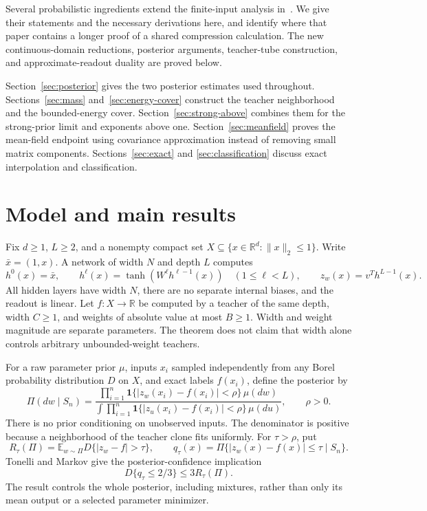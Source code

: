 \documentclass[11pt]{article}
\theoremstyle{remark}\newtheorem{remark}[theorem]{Remark}
\newcommand{\E}{\mathbb E}\newcommand{\Prb}{\mathbb P}\newcommand{\R}{\mathbb R}
\begin{document}
Several probabilistic ingredients extend the finite-input analysis
in~\cite{nongaus}. We give their statements and the necessary derivations
here, and identify where that paper contains a longer proof of a shared
compression calculation. The new continuous-domain reductions, posterior
arguments, teacher-tube construction, and approximate-readout duality are
proved below.

Section~\ref{sec:posterior} gives the two posterior estimates used
throughout. Sections~\ref{sec:mass} and~\ref{sec:energy-cover} construct
the teacher neighborhood and the bounded-energy cover.
Section~\ref{sec:strong-above} combines them for the strong-prior limit
and exponents above one. Section~\ref{sec:meanfield} proves the
mean-field endpoint using covariance approximation instead of removing
small matrix components. Sections~\ref{sec:exact} and
\ref{sec:classification} discuss exact interpolation and classification.

\section{Model and main results}\label{sec:model}
Fix $d\geq1$, $L\geq2$, and a nonempty compact set
$X\subseteq\{x\in\R^d:\|x\|_2\leq1\}$. Write $\bar x=(1,x)$.
A network of width $N$ and depth $L$ computes
\[
 h^0(x)=\bar x,\qquad h^\ell(x)=\tanh(W^\ell h^{\ell-1}(x))
 \quad(1\leq\ell<L),\qquad z_w(x)=v^Th^{L-1}(x).
\]
All hidden layers have width $N$, there are no separate internal biases,
and the readout is linear. Let $f:X\to\R$ be computed by a teacher of
the same depth, width $C\geq1$, and weights of absolute value at most
$B\geq1$. Width and weight magnitude are separate parameters. The theorem
does not claim that width alone controls arbitrary unbounded-weight teachers.

For a raw parameter prior $\mu$, inputs $x_i$ sampled independently from
any Borel probability distribution $D$ on $X$, and exact labels $f(x_i)$,
define the posterior by
\begin{equation}\label{eq:posterior}
 \Pi(dw\mid S_n)=
 \frac{\prod_{i=1}^n\mathbf1\{|z_w(x_i)-f(x_i)|<\rho\}\,\mu(dw)}
 {\int\prod_{i=1}^n\mathbf1\{|z_u(x_i)-f(x_i)|<\rho\}\,\mu(du)},
 \qquad \rho>0.
\end{equation}
There is no prior conditioning on unobserved inputs. The denominator is
positive because a neighborhood of the teacher clone fits uniformly.
For $\tau>\rho$, put
\[
 R_\tau(\Pi)=\E_{w\sim\Pi}D\{|z_w-f|>\tau\},\qquad
 q_\tau(x)=\Pi\{|z_w(x)-f(x)|\leq\tau\mid S_n\}.
\]
Tonelli and Markov give the posterior-confidence implication
\begin{equation}\label{eq:confidence}
 D\{q_\tau\leq2/3\}\leq3R_\tau(\Pi).
\end{equation}
The result controls the whole posterior, including mixtures, rather than
only its mean output or a selected parameter minimizer.
\end{document}
